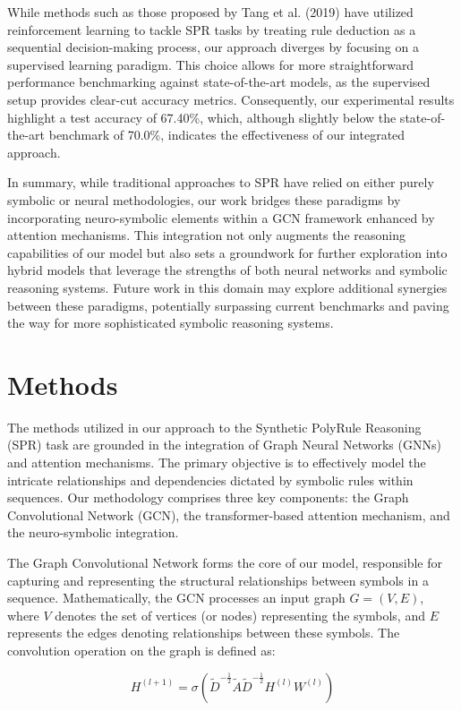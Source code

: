 \documentclass{article}
\begin{document}
While methods such as those proposed by Tang et al. (2019) have utilized reinforcement learning to tackle SPR tasks by treating rule deduction as a sequential decision-making process, our approach diverges by focusing on a supervised learning paradigm. This choice allows for more straightforward performance benchmarking against state-of-the-art models, as the supervised setup provides clear-cut accuracy metrics. Consequently, our experimental results highlight a test accuracy of 67.40\%, which, although slightly below the state-of-the-art benchmark of 70.0\%, indicates the effectiveness of our integrated approach.

In summary, while traditional approaches to SPR have relied on either purely symbolic or neural methodologies, our work bridges these paradigms by incorporating neuro-symbolic elements within a GCN framework enhanced by attention mechanisms. This integration not only augments the reasoning capabilities of our model but also sets a groundwork for further exploration into hybrid models that leverage the strengths of both neural networks and symbolic reasoning systems. Future work in this domain may explore additional synergies between these paradigms, potentially surpassing current benchmarks and paving the way for more sophisticated symbolic reasoning systems.

\section{Methods}
The methods utilized in our approach to the Synthetic PolyRule Reasoning (SPR) task are grounded in the integration of Graph Neural Networks (GNNs) and attention mechanisms. The primary objective is to effectively model the intricate relationships and dependencies dictated by symbolic rules within sequences. Our methodology comprises three key components: the Graph Convolutional Network (GCN), the transformer-based attention mechanism, and the neuro-symbolic integration.

The Graph Convolutional Network forms the core of our model, responsible for capturing and representing the structural relationships between symbols in a sequence. Mathematically, the GCN processes an input graph \( G = (V, E) \), where \( V \) denotes the set of vertices (or nodes) representing the symbols, and \( E \) represents the edges denoting relationships between these symbols. The convolution operation on the graph is defined as:

\[
H^{(l+1)} = \sigma\left( \tilde{D}^{-\frac{1}{2}} \tilde{A} \tilde{D}^{-\frac{1}{2}} H^{(l)} W^{(l)} \right)
\]
\end{document}
